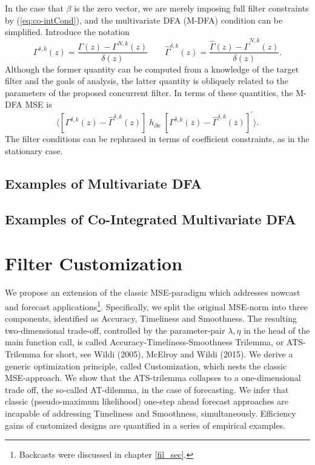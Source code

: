\documentclass[a4paper]{book}
\begin{document}
 In the case that $\beta$ is the zero vector, we are merely imposing full filter constraints by (\ref{eq:co-intCond}), and the multivariate DFA (M-DFA) condition
  can be simplified.  Introduce the notation
\[
    \Gamma^{\delta,k} (z) =  \frac{ \Gamma (z) - \Gamma^{N,k} (z) }{ \delta (z) } \qquad
  \widehat{\Gamma}^{\delta, k} (z) =  \frac{ \widehat{\Gamma} (z) - \widehat{\Gamma}^{N,k} (z) }{ \delta (z) }.
\]
  Although the former quantity can be computed from a knowledge of the target filter and the goals of analysis, the latter quantity is obliquely related to the parameters of the proposed concurrent filter.  In terms of these quantities, the M-DFA MSE is
\[
 \langle   \left[   \Gamma^{\delta, k} (z) -  \widehat{\Gamma}^{\delta, k} (z)  \right]   \; h_{\partial x} \;
  { \left[  \Gamma^{\delta, k} (\overline{z}) -  \widehat{\Gamma}^{\delta, k} (\overline{z})    \right] }^{\prime} \rangle.
\]
 The filter conditions can be rephrased in terms of coefficient constraints, as in the stationary case.  


\section{Examples of Multivariate DFA}


\section{Examples of Co-Integrated Multivariate DFA}





 



\chapter{Filter Customization}\label{ats_sec}

We propose an extension of the classic MSE-paradigm which addresses
 nowcast and forecast applications\footnote{Backcasts were discussed 
in chapter \ref{fil_sec}.}. Specifically, we split the original MSE-norm 
into three components, identified as Accuracy, Timeliness and Smoothness. 
The resulting two-dimensional trade-off, controlled by the parameter-pair 
$\lambda,\eta$ in the head of the main function call, is called 
Accuracy-Timeliness-Smoothness Trilemma, or ATS-Trilemma for short,
 see Wildi (2005), McElroy and Wildi (2015). We derive  a generic 
optimization principle, called Customization, which nests the classic
 MSE-approach.  We show that the ATS-trilemma collapses to a one-dimensional 
trade off, the so-called AT-dilemma, in the case of forecasting. We infer 
 that classic (pseudo-maximum likelihood)  one-step ahead forecast
 approaches are incapable of addressing Timeliness and Smoothness, 
simultaneously. Efficiency gains of customized designs are quantified 
in a series of empirical examples. \\
\end{document}

